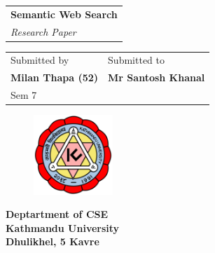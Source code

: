 \thispagestyle{empty}

\makeatletter
\setlength\@fptop{0pt}
\setlength{}
\setlength\@fpbot{0pt}
\makeatother

\begin{table}[t]
  \begin{tabular}{l}
    \Huge{\bf{Semantic Web Search}} \\
    \textit{ Research Paper}
    \date{\today}
  \end{tabular}
      \end{table}
      
\begin{table}
  \begin{tabular}{p{.5\linewidth} p{.5\linewidth}}
    \large{Submitted by} & \large{Submitted to}\\
    \Large{\bf Milan Thapa (52)} & \Large{\bf Mr Santosh Khanal}\\                 
    \large{Sem 7}\\
  \end{tabular}  
  
  
  \vspace{-0.5cm}\begin{figure}
    \includegraphics[height=3cm]{./img/ku_logo}
  \end{figure}
  
 \hspace{0cm} \vspace{0.5cm}\large{\bf Deptartment of CSE}\\
  \large{\bf Kathmandu University}\\
  \large{\bf Dhulikhel, 5 Kavre}

\end{table}

